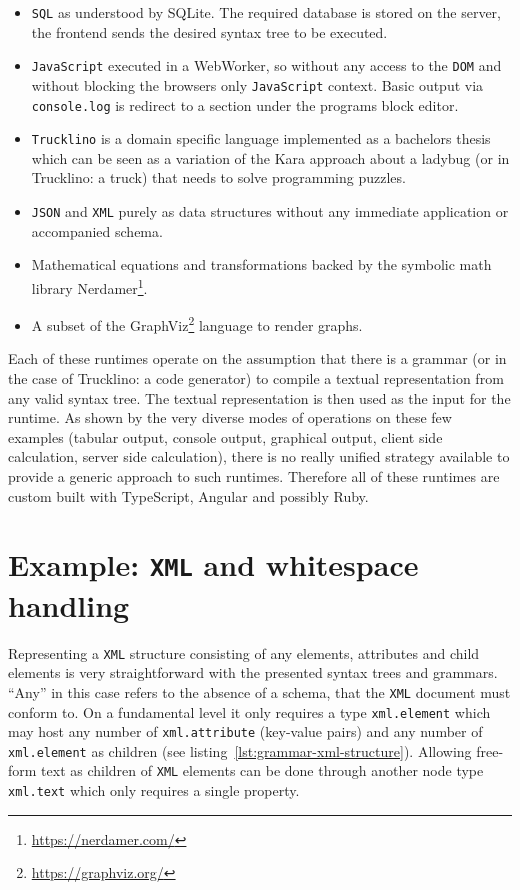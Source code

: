 \documentclass[sigconf,natbib=false,review=true,anonymous]{acmart}
\begin{document}
\begin{itemize}
\item \texttt{SQL} as understood by SQLite. The required database is stored on the server, the frontend sends the desired syntax tree to be executed.

\item \texttt{JavaScript} executed in a WebWorker, so without any access to the \texttt{DOM} and without blocking the browsers only \texttt{JavaScript} context. Basic output via \texttt{console.log} is redirect to a section under the programs block editor.

\item \texttt{Trucklino} is a domain specific language implemented as a bachelors thesis \cite{popp_konzeption_2019} which can be seen as a variation of the Kara approach\cite{hartmann_kara_2001} about a ladybug (or in Trucklino: a truck) that needs to solve programming puzzles.

\item \texttt{JSON} and \texttt{XML} purely as data structures without any immediate application or accompanied schema.

\item Mathematical equations and transformations backed by the symbolic math library Nerdamer\footnote{\url{https://nerdamer.com/}}.

\item A subset of the GraphViz\footnote{\url{https://graphviz.org/}} language to render graphs.
\end{itemize}

Each of these runtimes operate on the assumption that there is a grammar (or in the case of Trucklino: a code generator) to compile a textual representation from any valid syntax tree. The textual representation is then used as the input for the runtime. As shown by the very diverse modes of operations on these few examples (tabular output, console output, graphical output, client side calculation, server side calculation), there is no really unified strategy available to provide a generic approach to such runtimes. Therefore all of these runtimes are custom built with TypeScript, Angular and possibly Ruby.

\section{Example: \texttt{XML} and whitespace handling}

Representing a \texttt{XML} structure consisting of any elements, attributes and child elements is very straightforward with the presented syntax trees and grammars. \enquote{Any} in this case refers to the absence of a schema, that the \texttt{XML} document must conform to. On a fundamental level it only requires a type \texttt{xml.element} which may host any number of \texttt{xml.attribute} (key-value pairs) and any number of \texttt{xml.element} as children (see listing~\ref{lst:grammar-xml-structure}). Allowing free-form text as children of \texttt{XML} elements can be done through another node type \texttt{xml.text} which only requires a single property.
\end{document}

